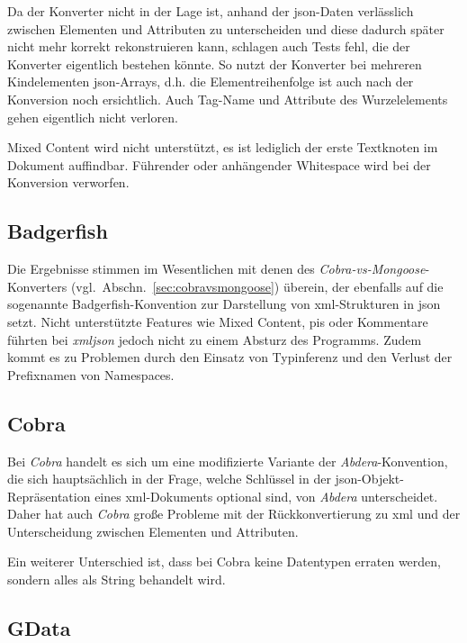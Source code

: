 Da der Konverter nicht in der Lage ist, anhand der \acrshort{json}-Daten verlässlich zwischen Elementen und Attributen zu unterscheiden und diese dadurch später nicht mehr korrekt rekonstruieren kann, schlagen auch Tests fehl, die der Konverter eigentlich bestehen könnte. So nutzt der Konverter bei mehreren Kindelementen \acrshort{json}-Arrays, d.h. die Elementreihenfolge ist auch nach der Konversion noch ersichtlich.
Auch Tag-Name und Attribute des Wurzelelements gehen eigentlich nicht verloren.

Mixed Content wird nicht unterstützt, es ist lediglich der erste Textknoten im Dokument auffindbar.
Führender oder anhängender Whitespace wird bei der Konversion verworfen.

\subsection{Badgerfish}
\label{sec:xmljson-badgerfish}

Die Ergebnisse stimmen im Wesentlichen mit denen des \emph{Cobra-vs-Mongoose}-Konverters (vgl.~Abschn.~\ref{sec:cobravsmongoose}) überein, der ebenfalls auf die sogenannte Badgerfish-Konvention zur Darstellung von \acrshort{xml}-Strukturen in \acrshort{json} setzt. Nicht unterstützte Features wie Mixed Content, \glspl{pi} oder Kommentare führten bei \emph{xmljson} jedoch nicht zu einem Absturz des Programms. Zudem kommt es zu Problemen durch den Einsatz von Typinferenz und den Verlust der Prefixnamen von Namespaces.

\subsection{Cobra}
\label{sec:xmljson-cobra}

Bei \emph{Cobra} handelt es sich um eine modifizierte Variante der \emph{Abdera}-Konvention, die sich hauptsächlich in der Frage, welche Schlüssel in der \acrshort{json}-Objekt-Repräsentation eines \acrshort{xml}-Dokuments optional sind, von \emph{Abdera} unterscheidet. Daher hat auch \emph{Cobra} große Probleme mit der Rückkonvertierung zu \acrshort{xml} und der Unterscheidung zwischen Elementen und Attributen.

Ein weiterer Unterschied ist, dass bei Cobra keine Datentypen erraten werden, sondern alles als String behandelt wird.

\subsection{GData}
\label{sec:xmljson-gdata}

